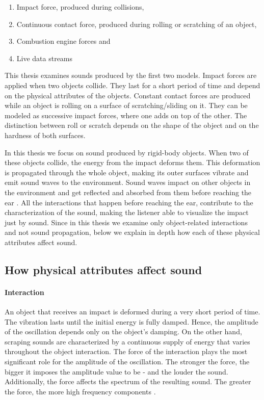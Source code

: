 \begin{enumerate}
\item Impact force, produced during collisions,
\item Continuous contact force, produced during rolling or scratching of an object,
\item Combustion engine forces and
\item Live data streams
\end{enumerate}

This thesis examines sounds produced by the first two models. Impact forces are applied when two objects collide. They last for a short period of time and depend on the physical attributes of the objects. Constant contact forces are produced while an object is rolling on a surface of scratching/sliding on it. They can be modeled as successive impact forces, where one adds on top of the other. The distinction between roll or scratch depends on the shape of the object and on the hardness of both surfaces.

In this thesis we focus on sound produced by rigid-body objects. When two of these objects collide, the energy from the impact deforms them. This deformation is propagated through the whole object, making its outer surfaces vibrate and emit sound waves to the environment. Sound waves impact on other objects in the environment and get reflected and absorbed from them before reaching the ear \cite{van1998sounds}. All the interactions that happen before reaching the ear, contribute to the characterization of the sound, making the listener able to visualize the impact just by sound. Since in this thesis we examine only object-related interactions and not sound propagation, below we explain in depth how each of these physical attributes affect sound.

\subsection{How physical attributes affect sound}

\paragraph{Interaction\\}
An object that receives an impact is deformed during a very short period of time. The vibration lasts until the initial energy is fully damped. Hence, the amplitude of the oscillation depends only on the object's damping. On the other hand, scraping sounds are characterized by a continuous supply of energy that varies throughout the object interaction. The force of the interaction plays the most significant role for the amplitude of the oscillation. The stronger the force, the bigger it imposes the amplitude value to be - and the louder the sound. Additionally, the force affects the spectrum of the resulting sound. The greater the force, the more high frequency components \cite{gaver1993world}.

